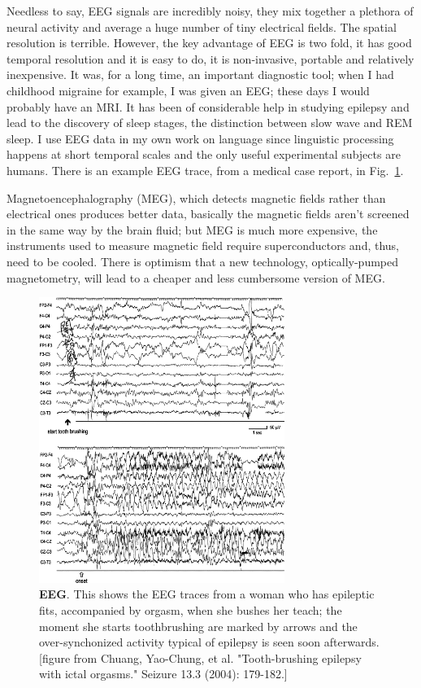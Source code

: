 \documentclass[12pt]{article}
\begin{document}
Needless to say, EEG signals are incredibly noisy, they mix together a
plethora of neural activity and average a huge number of tiny
electrical fields. The spatial resolution is terrible. However, the
key advantage of EEG is two fold, it has good temporal resolution and
it is easy to do, it is non-invasive, portable and relatively
inexpensive. It was, for a long time, an important diagnostic tool;
when I had childhood migraine for example, I was given an EEG; these
days I would probably have an MRI. It has been of considerable help in
studying epilepsy and lead to the discovery of sleep stages, the
distinction between slow wave and REM sleep. I use EEG data in my own
work on language since linguistic processing happens at short temporal
scales and the only useful experimental subjects are humans. There is
an example EEG trace, from a medical case report, in
Fig.~\ref{fig:eeg}.

Magnetoencephalography (MEG), which detects magnetic fields rather
than electrical ones produces better data, basically the magnetic
fields aren't screened in the same way by the brain fluid; but MEG is
much more expensive, the instruments used to measure magnetic field
require superconductors and, thus, need to be cooled. There is
optimism that a new technology, optically-pumped magnetometry, will
lead to a cheaper and less cumbersome version of MEG.



\begin{figure}
  \begin{center}
    \includegraphics[width=8cm]{eeg.png}
    \end{center}
  \caption{\textbf{EEG}. This shows the EEG traces from a woman who
    has epileptic fits, accompanied by orgasm, when she bushes her
    teach; the moment she starts toothbrushing are marked by arrows
    and the over-synchonized activity typical of epilepsy is seen soon
    afterwards. [figure from Chuang, Yao-Chung, et al. "Tooth-brushing
      epilepsy with ictal orgasms." Seizure 13.3 (2004):
      179-182.]\label{fig:eeg}}
\end{figure}
\end{document}
